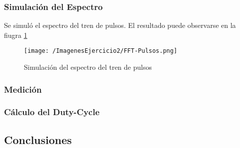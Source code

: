 \subsubsection{Simulación del Espectro}

Se simuló el espectro del tren de pulsos. El resultado puede observarse en la fiugra \ref{fig:simpulso}

\begin{figure}[H]
	\centering
	\texttt{[image: /ImagenesEjercicio2/FFT-Pulsos.png]}
\caption{Simulación del espectro del tren de pulsos}
	\label{fig:simpulso}
\end{figure}

\subsubsection{Medición}

\subsubsection{Cálculo del Duty-Cycle}

\subsection{Conclusiones}

